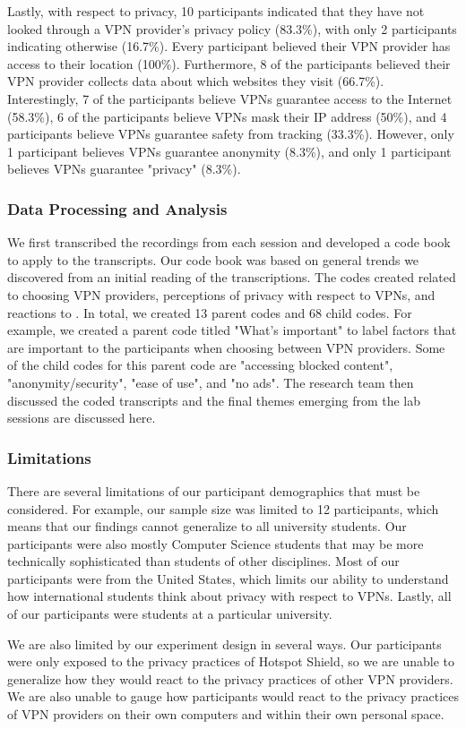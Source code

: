 Lastly, with respect to privacy, 10 participants indicated that they have not looked through a VPN provider's privacy policy (83.3\%), with only 2 participants indicating otherwise (16.7\%).
Every participant believed their VPN provider has access to their location (100\%).
Furthermore, 8 of the participants believed their VPN provider collects data about which websites they visit (66.7\%).
Interestingly, 7 of the participants believe VPNs guarantee access to the Internet (58.3\%), 6 of the participants believe VPNs mask their IP address (50\%), and 4 participants believe VPNs guarantee safety from tracking (33.3\%).
However, only 1 participant believes VPNs guarantee anonymity (8.3\%), and only 1 participant believes VPNs guarantee "privacy" (8.3\%).

\subsubsection{Data Processing and Analysis}
We first transcribed the recordings from each session and developed a code book to apply to the transcripts.
Our code book was based on general trends we discovered from an initial reading of the transcriptions.
The codes created related to choosing VPN providers, perceptions of privacy with respect to VPNs, and reactions to \tool.
In total, we created 13 parent codes and 68 child codes. For example, we created a parent code titled "What's important" to label factors that are important to the participants when choosing between VPN providers. Some of the child codes for this parent code are "accessing blocked content", "anonymity/security", "ease of use", and "no ads". The research team then discussed the coded transcripts and the final themes emerging from the lab sessions are discussed here.

\subsubsection{Limitations}
There are several limitations of our participant demographics that must be considered.
For example, our sample size was limited to 12 participants, which means that our findings cannot generalize to all university students.
Our participants were also mostly Computer Science students that may be more technically sophisticated than students of other disciplines.
Most of our participants were from the United States, which limits our ability to understand how international students think about privacy with respect to VPNs.
Lastly, all of our participants were students at a particular university.

We are also limited by our experiment design in several ways.
Our participants were only exposed to the privacy practices of Hotspot Shield, so we are unable to generalize how they would react to the privacy practices of other VPN providers.
We are also unable to gauge how participants would react to the privacy practices of VPN providers on their own computers and within their own personal space.
